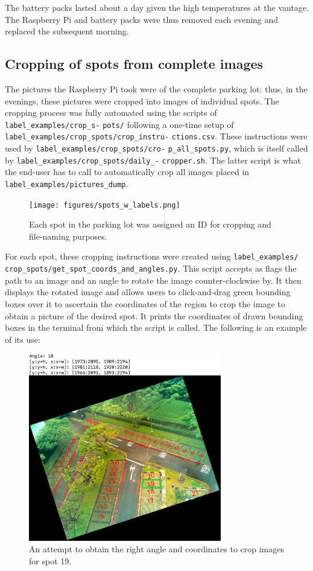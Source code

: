 \documentclass[a4paper, 11pt]{article} %
\begin{document}
		The battery packs lasted about a day given the high temperatures at the 
		vantage. The Raspberry Pi and battery packs were thus removed each 
		evening and replaced the subsequent morning.
	\subsection{Cropping of spots from complete images}
		The pictures the Raspberry Pi took were of the complete parking lot: 
		thus, in the evenings, these pictures were cropped into images of 
		individual spots. The cropping process was fully automated using the 
		scripts of \texttt{label\_examples/crop\_s-} \texttt{pots/} following a 
		one-time 
		setup of 
		\texttt{label\_examples/crop\_spots/crop\_instru-} \texttt{ctions.csv}. 
		These instructions were 
		used by
		\texttt{label\_examples/crop\_spots/cro-} \texttt{p\_all\_spots.py}, 
		which is 
		itself called by
		\texttt{label\_examples/crop\_spots/daily\_-} \texttt{cropper.sh}. The 
		latter 
		script is 
		what the end-user has to call to automatically
		crop all images placed in \texttt{label\_examples/pictures\_dump}.
		\begin{figure}[H]
			\centering
			\texttt{[image: figures/spots\_w\_labels.png]}
			\caption{Each spot in the parking lot was assigned an ID for 
			cropping and file-naming purposes.}
		\end{figure}
		\hspace*{-6mm}For each spot, these cropping instructions were created 
		using \texttt{label\_examples/} 
		\texttt{crop\_spots/get\_spot\_coords\_and\_angles.py}.
		This script accepts as flags
		the path to an image and an angle to rotate the image counter-clockwise 
		by. It then displays the
		rotated image and allows users to click-and-drag green bounding boxes 
		over it to ascertain the coordinates
		of the region to crop the image to obtain a picture of the desired spot. It prints the coordinates of drawn
		bounding boxes in the terminal from which the script is called. The following is an example of its use:
		\begin{figure}[H]
			\centering
			\includegraphics[width=0.75\textwidth]{figures/spot_coord_demo}
			\caption{An attempt to obtain the right angle and 
			coordinates to crop images for spot 19.}
		\end{figure}
\end{document}
